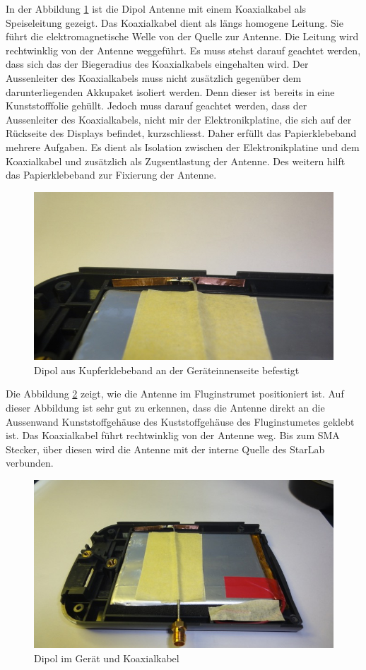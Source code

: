 \newpage
In der Abbildung \ref{fig:DipolausKupferbandGeraeteinnenseite} ist  die Dipol Antenne mit einem Koaxialkabel als Speiseleitung gezeigt. Das Koaxialkabel dient als längs homogene Leitung. Sie führt die elektromagnetische Welle von der Quelle zur Antenne. Die Leitung wird rechtwinklig von der Antenne weggeführt. Es muss stehst darauf geachtet werden, dass sich das der Biegeradius des Koaxialkabels eingehalten wird. Der Aussenleiter des Koaxialkabels muss nicht zusätzlich gegenüber dem darunterliegenden Akkupaket isoliert werden. Denn dieser ist bereits in eine Kunststofffolie gehüllt. Jedoch muss darauf geachtet werden, dass der Aussenleiter des Koaxialkabels, nicht mir der Elektronikplatine, die sich auf der Rückseite des Displays befindet, kurzschliesst. Daher erfüllt das Papierklebeband mehrere Aufgaben. Es dient als Isolation zwischen der Elektronikplatine und dem Koaxialkabel und zusätzlich als Zugsentlastung der Antenne. Des weitern hilft das Papierklebeband zur Fixierung der Antenne.\\
\begin{figure}[!ht]
	\centering
	\includegraphics[width=15cm]{content/bilder/Implementierung/DipolIMGeraet.jpg}%
	\caption{Dipol aus Kupferklebeband an der Geräteinnenseite befestigt}
	\label{fig:DipolausKupferbandGeraeteinnenseite}
\end{figure}
\clearpage
\newpage
Die Abbildung \ref{fig:DipolimGeraet} zeigt, wie die Antenne im Fluginstrumet positioniert ist. Auf dieser Abbildung ist sehr gut zu erkennen, dass die Antenne direkt an die Aussenwand Kunststoffgehäuse des Kuststoffgehäuse des Fluginstumetes geklebt ist. Das Koaxialkabel führt rechtwinklig von der Antenne weg. Bis zum SMA Stecker, über diesen wird die Antenne mit der interne Quelle des StarLab verbunden.\\
\begin{figure}[!ht]
	\centering
	\includegraphics[width=15cm]{content/bilder/Implementierung/DipolKabelGeraet.jpg}%
	\caption{Dipol im Gerät und Koaxialkabel}
	\label{fig:DipolimGeraet}
\end{figure}






